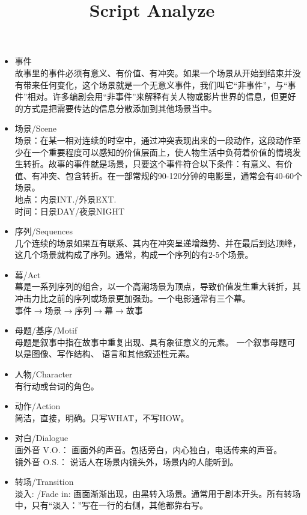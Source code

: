 \documentclass[UTF8,9pt]{ctexart}
\title{Script Analyze}
\begin{document}
 
\maketitle
{}
\begin{itemize} 
\item 事件\\
    故事里的事件必须有意义、有价值、有冲突。如果一个场景从开始到结束并没有带来任何变化，这个场景就是一个无意义事件，我们叫它“非事件”，与“事件”相对。许多编剧会用“非事件”来解释有关人物或影片世界的信息，但更好的方式是把需要传达的信息分散添加到其他场景当中。
\item 场景/Scene\\
    场景：在某一相对连续的时空中，通过冲突表现出来的一段动作，这段动作至少在一个重要程度可以感知的价值层面上，使人物生活中负荷着价值的情境发生转折。故事的事件就是场景，只要这个事件符合以下条件：有意义、有价值、有冲突、包含转折。在一部常规的90-120分钟的电影里，通常会有40-60个场景。\\
    地点：内景INT./外景EXT.\\
    时间：日景DAY/夜景NIGHT
\item 序列/Sequences\\
    几个连续的场景如果互有联系、其内在冲突呈递增趋势、并在最后到达顶峰，这几个场景就构成了序列。通常，构成一个序列的有2-5个场景。
\item 幕/Act\\
    幕是一系列序列的组合，以一个高潮场景为顶点，导致价值发生重大转折，其冲击力比之前的序列或场景更加强劲。一个电影通常有三个幕。\\
    事件$\rightarrow$场景$\rightarrow$序列$\rightarrow$幕$\rightarrow$故事
\item 母题/基序/Motif\\
    母题是叙事中指在故事中重复出现、具有象征意义的元素。 一个叙事母题可以是图像、写作结构、 语言和其他叙述性元素。
\item 人物/Character\\
    有行动或台词的角色。
\item 动作/Action\\
    简洁，直接，明确。只写WHAT，不写HOW。
\item 对白/Dialogue\\
    画外音 V.O.： 画面外的声音。包括旁白，内心独白，电话传来的声音。\\
    镜外音 O.S.： 说话人在场景内镜头外，场景内的人能听到。
\item 转场/Transition\\
    淡入: /Fade in: 画面渐渐出现，由黑转入场景。通常用于剧本开头。所有转场中，只有“淡入：”写在一行的右侧，其他都靠右写。\\

\end{itemize}
\end{document}
